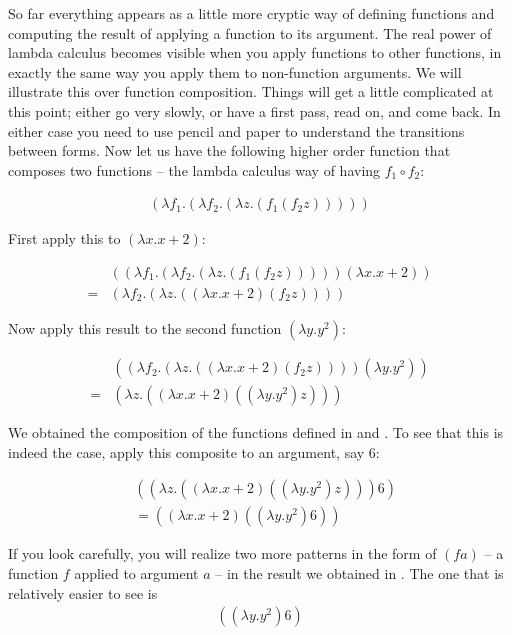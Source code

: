 \documentclass[11pt]{article}
\begin{document}
So far everything appears as a little more cryptic way of defining
functions and computing the result of applying a function to its
argument. The real power of lambda calculus becomes visible when you
apply functions to other functions, in exactly the same way you apply
them to non-function arguments. We will illustrate this over function
composition. Things will get a little complicated at this point;
either go very slowly, or have a first pass, read on, and come back. In
either case you need to use pencil and paper to understand the
transitions between forms.  Now let us have the following higher order
function that composes two functions -- the lambda calculus way of
having $f_1\circ f_2$:

\begin{align}
(\lambda f_1.(\lambda f_2.(\lambda z.(f_1(f_2z)))))
\end{align}

First apply this to $(\lambda x. x + 2)$:

\begin{align}
& ((\lambda f_1.(\lambda f_2.(\lambda z.(f_1(f_2z))))) (\lambda x. x +2))\\
=& (\lambda f_2.(\lambda z.((\lambda x. x +2)(f_2z)))) \nonumber
\end{align}

Now apply this result to the second function $(\lambda y. y^2)$:

\begin{align}
&  ((\lambda f_2.(\lambda z.((\lambda x. x +2)(f_2z))))(\lambda y. y^2)) \\
=& (\lambda z.((\lambda x. x+2)((\lambda y. y^2)z))) \nonumber
\end{align}

We obtained the composition of the functions defined in  and . To see that this is indeed the case, apply this composite to an argument, say 6:

\begin{align}
\label{faint} & ((\lambda z.((\lambda x. x+2)((\lambda y. y^2)z))) 6)\\
&=  ((\lambda x. x+2)((\lambda y. y^2)6))\nonumber
\end{align}

If you look carefully, you will realize two more patterns in the form of $(f a)$ -- a function $f$ applied to argument $a$ -- in the result we obtained in . The one that is relatively easier to see is
\begin{align}
\label{occ1} ((\lambda y. y^2)6)
\end{align}
\end{document}
